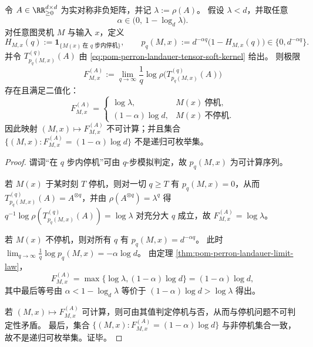 \begin{theorem}[亚满谱对称门核的停机嵌入泛化]\label{thm:conclusion-temperature-kernel-free-energy-halting-embedding-subfull-spectrum}
令 \(A\in\RR_{\ge 0}^{d\times d}\) 为实对称非负矩阵，并记 \(\lambda:=\rho(A)\)。
假设 \(\lambda<d\)，并取任意
\[
\alpha\in\bigl(0,\ 1-\log_d\lambda\bigr).
\]
对任意图灵机 \(M\) 与输入 \(x\)，定义
\[
H_{M,x}(q):=\mathbf 1_{\{M(x)\ \text{在 }q\text{ 步内停机}\}},
\qquad
p_q(M,x):=d^{-\alpha q}\bigl(1-H_{M,x}(q)\bigr)\in\{0,d^{-\alpha q}\}.
\]
并令 \(T^{(q)}_{p_q(M,x)}(A)\) 由 \eqref{eq:pom-perron-landauer-tensor-soft-kernel} 给出。
则极限
\[
F^{(A)}_{M,x}:=\lim_{q\to\infty}\frac1q\log\rho\!\bigl(T^{(q)}_{p_q(M,x)}(A)\bigr)
\]
存在且满足二值化：
\[
F^{(A)}_{M,x}=
\begin{cases}
\log\lambda, & M(x)\ \text{停机},\\[2pt]
(1-\alpha)\log d, & M(x)\ \text{不停机}.
\end{cases}
\]
因此映射 \((M,x)\mapsto F^{(A)}_{M,x}\) 不可计算；并且集合 \(\{(M,x):F^{(A)}_{M,x}=(1-\alpha)\log d\}\) 不是递归可枚举集。
\end{theorem}
\begin{proof}
谓词“在 \(q\) 步内停机”可由 \(q\)-步模拟判定，故 \(p_q(M,x)\) 为可计算序列。
\par
若 \(M(x)\) 于某时刻 \(T\) 停机，则对一切 \(q\ge T\) 有 \(p_q(M,x)=0\)，从而 \(T^{(q)}_{p_q(M,x)}(A)=A^{\otimes q}\)，并由 \(\rho(A^{\otimes q})=\lambda^q\) 得
\(
q^{-1}\log\rho(T^{(q)}_{p_q(M,x)}(A))=\log\lambda
\)
对充分大 \(q\) 成立，故 \(F^{(A)}_{M,x}=\log\lambda\)。
\par
若 \(M(x)\) 不停机，则对所有 \(q\) 有 \(p_q(M,x)=d^{-\alpha q}\)。
此时
\(
\lim_{q\to\infty}\frac1q\log p_q(M,x)=-\alpha\log d
\)。
由定理 \ref{thm:pom-perron-landauer-limit-law}，
\[
F^{(A)}_{M,x}=\max\{\log\lambda,(1-\alpha)\log d\}=(1-\alpha)\log d,
\]
其中最后等号由 \(\alpha<1-\log_d\lambda\) 等价于 \((1-\alpha)\log d>\log\lambda\) 得出。
\par
若 \((M,x)\mapsto F^{(A)}_{M,x}\) 可计算，则可由其值判定停机与否，从而与停机问题不可判定性矛盾。
最后，集合 \(\{(M,x):F^{(A)}_{M,x}=(1-\alpha)\log d\}\) 与非停机集合一致，故不是递归可枚举集。证毕。
\end{proof}

